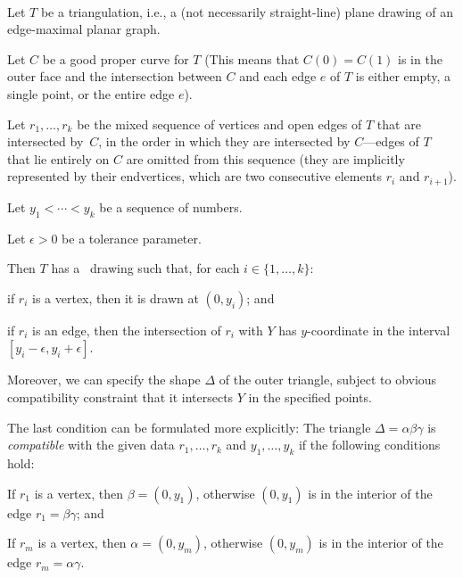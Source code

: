 \begin{thm}\ \newline
  \begin{compactitem}
    \item Let $T$ be a triangulation, i.e.,
      a (not necessarily straight-line) plane drawing of an edge-maximal
      planar graph.
    \item Let $C$ be a good proper curve for $T$ (This means that $C(0)=C(1)$
      is in the outer face and the intersection between $C$ and each edge
      $e$ of $T$ is either empty, a single point, or the entire edge $e$).
     \item Let $r_1,\ldots,r_k$ be the mixed sequence of vertices and open edges of $T$ that are intersected by~$C$, in the order in which they are intersected by $C$---edges of $T$ that lie entirely on $C$ are omitted from this sequence (they are implicitly represented by their endvertices, which are two consecutive elements $r_i$ and $r_{i+1}$).
	\item Let $y_1<\cdots<y_k$ be a sequence of numbers.
                  
       \item Let $\epsilon>0$ be a tolerance parameter.
\end{compactitem}
Then
        $T$
        has a \Fary\ drawing such that,
	for each $i\in\{1,\ldots,k\}$: 
	\begin{compactitem}%
		\item if $r_i$ is a vertex, then it is drawn at $(0,y_i)$; and
		\item if $r_i$ is an edge, then the intersection of $r_i$ with $Y$ has $y$-coordinate in the interval $[y_i-\epsilon,y_i+\epsilon]$.
\end{compactitem}

Moreover, we can specify the shape $\Delta$ of the outer triangle,
subject to
obvious compatibility constraint that it intersects $Y$ in the specified points.
                
\end{thm}
The last condition can be formulated more explicitly:
The triangle $\Delta=\alpha\beta\gamma$ is \emph{compatible} with the
given data $r_1,\ldots,r_k$ and $y_1,\ldots,y_k$ if the following conditions hold:
\begin{compactitem}
	\item If $r_1$ is a vertex, then $\beta=(0,y_1)$, otherwise $(0, y_1)$ is in the interior of the edge $r_1=\beta\gamma$; and
	\item If $r_m$ is a vertex, then $\alpha=(0,y_m)$, otherwise $(0,y_m)$ is in the interior
	of the edge $r_m=\alpha\gamma$.
\end{compactitem}

